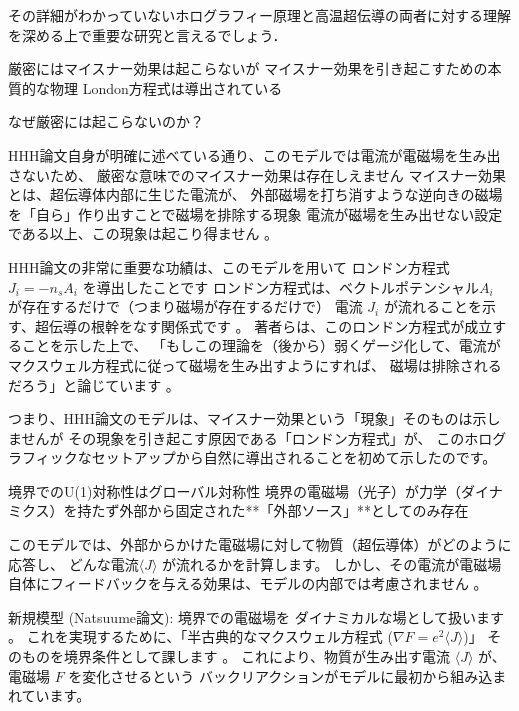 \documentclass[b5paper,11pt,dvipdfmx]{jsarticle}
\numberwithin{equation}{section}
\theoremstyle{definition}
\begin{document}
その詳細がわかっていないホログラフィー原理と高温超伝導の両者に対する理解を深める上で重要な研究と言えるでしょう．

















厳密にはマイスナー効果は起こらないが
マイスナー効果を引き起こすための本質的な物理
London方程式は導出されている

なぜ厳密には起こらないのか？

HHH論文自身が明確に述べている通り、このモデルでは電流が電磁場を生み出さないため、
厳密な意味でのマイスナー効果は存在しえません
マイスナー効果とは、超伝導体内部に生じた電流が、
外部磁場を打ち消すような逆向きの磁場を「自ら」作り出すことで磁場を排除する現象
電流が磁場を生み出せない設定である以上、この現象は起こり得ません 。

HHH論文の非常に重要な功績は、このモデルを用いて
ロンドン方程式 $J_i = -n_s A_i$ を導出したことです
ロンドン方程式は、ベクトルポテンシャル$A_i$ が存在するだけで（つまり磁場が存在するだけで）
電流 $J_i$ が流れることを示す、超伝導の根幹をなす関係式です 。
著者らは、このロンドン方程式が成立することを示した上で、
「もしこの理論を（後から）弱くゲージ化して、電流がマクスウェル方程式に従って磁場を生み出すようにすれば、
磁場は排除されるだろう」と論じています 。

つまり、HHH論文のモデルは、マイスナー効果という「現象」そのものは示しませんが
その現象を引き起こす原因である「ロンドン方程式」が、
このホログラフィックなセットアップから自然に導出されることを初めて示したのです。





境界でのU(1)対称性はグローバル対称性
境界の電磁場（光子）が力学（ダイナミクス）を持たず外部から固定された**「外部ソース」**としてのみ存在

このモデルでは、外部からかけた電磁場に対して物質（超伝導体）がどのように応答し、
どんな電流$\langle J \rangle$ が流れるかを計算します。
しかし、その電流が電磁場自体にフィードバックを与える効果は、モデルの内部では考慮されません 。

新規模型 (Natsuume論文):
境界での電磁場を
ダイナミカルな場として扱います 。
これを実現するために、「半古典的なマクスウェル方程式 ($\nabla F = e^2 \langle J \rangle$)」
そのものを境界条件として課します 。
これにより、物質が生み出す電流 $\langle J \rangle$ が、電磁場 $F$ を変化させるという
バックリアクションがモデルに最初から組み込まれています。
\end{document}
